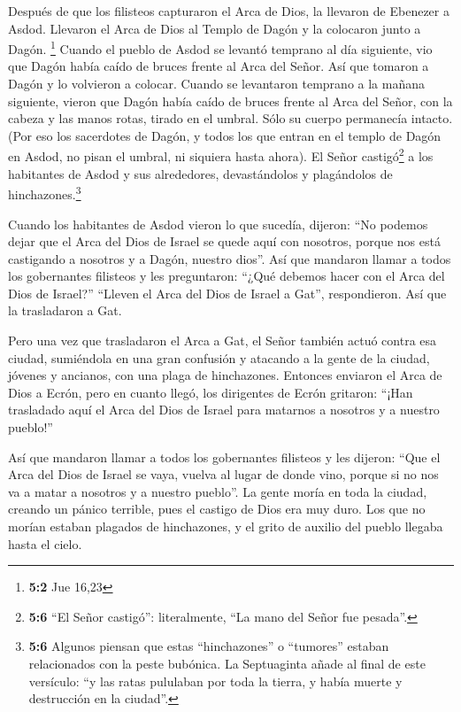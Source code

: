  Después de que los filisteos capturaron el Arca de Dios,
la llevaron de Ebenezer a Asdod.  Llevaron el Arca de Dios
al Templo de Dagón y la colocaron junto a Dagón. \footnote{\textbf{5:2}
  Jue 16,23}  Cuando el pueblo de Asdod se levantó
temprano al día siguiente, vio que Dagón había caído de bruces frente al
Arca del Señor. Así que tomaron a Dagón y lo volvieron a colocar.
 Cuando se levantaron temprano a la mañana siguiente,
vieron que Dagón había caído de bruces frente al Arca del Señor, con la
cabeza y las manos rotas, tirado en el umbral. Sólo su cuerpo permanecía
intacto.  (Por eso los sacerdotes de Dagón, y todos los
que entran en el templo de Dagón en Asdod, no pisan el umbral, ni
siquiera hasta ahora).  El Señor castigó\footnote{\textbf{5:6}
  ``El Señor castigó'': literalmente, ``La mano del Señor fue pesada''.}
a los habitantes de Asdod y sus alrededores, devastándolos y plagándolos
de hinchazones.\footnote{\textbf{5:6} Algunos piensan que estas
  ``hinchazones'' o ``tumores'' estaban relacionados con la peste
  bubónica. La Septuaginta añade al final de este versículo: ``y las
  ratas pululaban por toda la tierra, y había muerte y destrucción en la
  ciudad''.}

 Cuando los habitantes de Asdod vieron lo que sucedía,
dijeron: ``No podemos dejar que el Arca del Dios de Israel se quede aquí
con nosotros, porque nos está castigando a nosotros y a Dagón, nuestro
dios''.  Así que mandaron llamar a todos los gobernantes
filisteos y les preguntaron: ``¿Qué debemos hacer con el Arca del Dios
de Israel?'' ``Lleven el Arca del Dios de Israel a Gat'', respondieron.
Así que la trasladaron a Gat.

 Pero una vez que trasladaron el Arca a Gat, el Señor
también actuó contra esa ciudad, sumiéndola en una gran confusión y
atacando a la gente de la ciudad, jóvenes y ancianos, con una plaga de
hinchazones.  Entonces enviaron el Arca de Dios a Ecrón,
pero en cuanto llegó, los dirigentes de Ecrón gritaron: ``¡Han
trasladado aquí el Arca del Dios de Israel para matarnos a nosotros y a
nuestro pueblo!''

 Así que mandaron llamar a todos los gobernantes
filisteos y les dijeron: ``Que el Arca del Dios de Israel se vaya,
vuelva al lugar de donde vino, porque si no nos va a matar a nosotros y
a nuestro pueblo''. La gente moría en toda la ciudad, creando un pánico
terrible, pues el castigo de Dios era muy duro.  Los que
no morían estaban plagados de hinchazones, y el grito de auxilio del
pueblo llegaba hasta el cielo.

